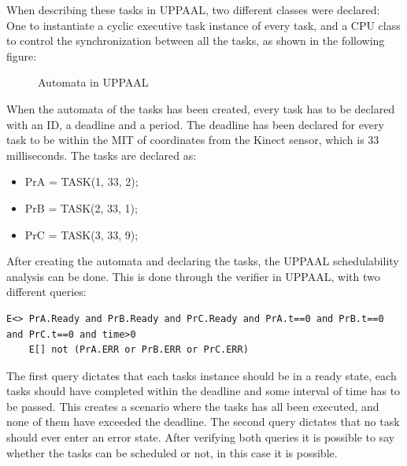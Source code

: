 When describing these tasks in UPPAAL, two different classes were declared: One to instantiate a cyclic executive task instance of every task, and a CPU class to control the synchronization between all the tasks, as shown in the following figure:

\begin{figure}[h]
	\centering
	\caption{Automata in UPPAAL}
	\label{UppaalModelAutomata}
\end{figure}

When the automata of the tasks has been created, every task has to be declared with an ID, a deadline and a period. The deadline has been declared for every task to be within the MIT of coordinates from the Kinect sensor, which is 33 milliseconds.
The tasks are declared as:

\begin{itemize}
	\item PrA = TASK(1, 33, 2);
	\item PrB = TASK(2, 33, 1);
	\item PrC = TASK(3, 33, 9);
\end{itemize}

After creating the automata and declaring the tasks, the UPPAAL schedulability analysis can be done. This is done through the verifier in UPPAAL, with two different queries:

\begin{lstlisting}[caption={Queries for UPPAAL}, label={QueriesAppendix}]
	E<> PrA.Ready and PrB.Ready and PrC.Ready and PrA.t==0 and PrB.t==0 and PrC.t==0 and time>0
	E[] not (PrA.ERR or PrB.ERR or PrC.ERR)
\end{lstlisting}

The first query dictates that each tasks instance should be in a ready state, each tasks should have completed within the deadline and some interval of time has to be passed. This creates a scenario where the tasks has all been executed, and none of them have exceeded the deadline.
The second query dictates that no task should ever enter an error state.
After verifying both queries it is possible to say whether the tasks can be scheduled or not, in this case it is possible.

